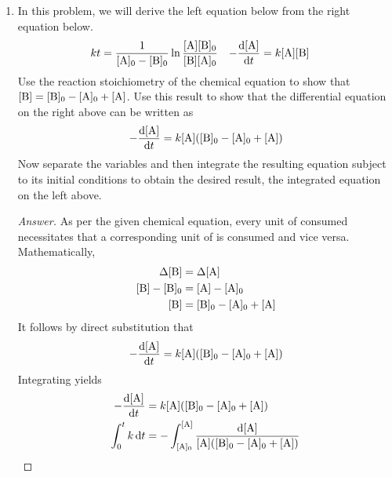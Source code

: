 \documentclass[../psets.tex]{subfiles}
\begin{document}
\begin{enumerate}[label={\textbf{28-\arabic*.}},leftmargin=3.5em]
\begin{proof}[Answer]
\begin{center}
        \end{center}
    \end{proof}
    \setcounter{enumi}{23}
    \item In this problem, we will derive the left equation below from the right equation below.
    \begin{align*}
        kt &= \frac{1}{[\ce{A}]_0-[\ce{B}]_0}\ln\frac{[\ce{A}][\ce{B}]_0}{[\ce{B}][\ce{A}]_0}&
        -\dv{[\ce{A}]}{t} &= k[\ce{A}][\ce{B}]
    \end{align*}
    Use the reaction stoichiometry of the chemical equation  to show that $[\ce{B}]=[\ce{B}]_0-[\ce{A}]_0+[\ce{A}]$. Use this result to show that the differential equation on the right above can be written as
    \begin{equation*}
        -\dv{[\ce{A}]}{t} = k[\ce{A}]([\ce{B}]_0-[\ce{A}]_0+[\ce{A}])
    \end{equation*}
    Now separate the variables and then integrate the resulting equation subject to its initial conditions to obtain the desired result, the integrated equation on the left above.
    \begin{proof}[Answer]
        As per the given chemical equation, every unit of  consumed necessitates that a corresponding unit of  is consumed and vice versa. Mathematically,
        \begin{align*}
            \Delta[\ce{B}] &= \Delta[\ce{A}]\\
            [\ce{B}]-[\ce{B}]_0 &= [\ce{A}]-[\ce{A}]_0\\
            [\ce{B}] &= [\ce{B}]_0-[\ce{A}]_0+[\ce{A}]
        \end{align*}
        It follows by direct substitution that
        \begin{equation*}
            -\dv{[\ce{A}]}{t} = k[\ce{A}]([\ce{B}]_0-[\ce{A}]_0+[\ce{A}])
        \end{equation*}
        Integrating yields
        \begin{align*}
            -\dv{[\ce{A}]}{t} &= k[\ce{A}]([\ce{B}]_0-[\ce{A}]_0+[\ce{A}])\\
            \int_0^tk\dd{t} &= -\int_{[\ce{A}]_0}^{[\ce{A}]}\frac{\dd{[\ce{A}]}}{[\ce{A}]([\ce{B}]_0-[\ce{A}]_0+[\ce{A}])}\\

\end{align*}
\end{proof}
\end{enumerate}
\end{document}
